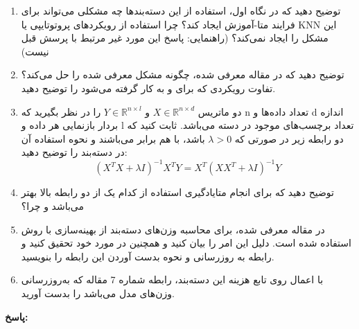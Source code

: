 \documentclass{article}
\begin{document}
\begin{enumerate}
	\item
	توضیح دهید که در نگاه اول، استفاده از این دسته‌بندها چه مشکلی می‌تواند برای فرایند متا-آموزش ایجاد کند؟ چرا استفاده از رویکردهای پروتوتایپی یا KNN این مشکل را ایجاد نمی‌کند؟ (راهنمایی: پاسخ این مورد غیر مرتبط با پرسش قبل نیست)

	\item
	توضیح دهید که در مقاله معرفی شده، چگونه مشکل معرفی شده را حل می‌کند؟ تفاوت رویکردی که برای
	  و 
	  به کار گرفته می‌شود را توضیح دهید.
	
	\item
	دو ماتریس
	$X \in {\mathbb{R}^{n \times d}}$
	و
	$Y \in {\mathbb{R}^{n \times l}}$
	را در نظر بگیرید که n تعداد داده‌ها و d اندازه بردار باز‌نمایی هر داده و l تعداد برچسب‌های موجود در دسته می‌باشد. ثابت کنید که دو رابطه زیر در صورتی که
	$\lambda  > 0$
	باشد، با هم برابر می‌باشند و نحوه استفاده آن در دسته‌بند 
	 را توضیح دهید:
	$$
	{\left( {{X^T}X + \lambda I} \right)^{ - 1}}{X^T}Y = {X^T}{\left( {X{X^T} + \lambda I} \right)^{ - 1}}Y
	$$
	
	\item
	توضیح دهید که برای انجام متایادگیری استفاده از کدام یک از دو رابطه بالا بهتر می‌باشد و چرا؟
	
	\item
	در مقاله معرفی شده، برای محاسبه وزن‌های دسته‌بند
	از بهینه‌سازی با روش 
استفاده شده است. دلیل این امر را بیان کنید و همچنین در مورد خود
	تحقیق کنید و رابطه به روزرسانی و نحوه بدست آوردن این رابطه را بنویسید.
	
	\item
	با اعمال
	روی تابع هزینه این دسته‌بند، رابطه شماره 7 مقاله که به‌روزرسانی وزن‌های مدل می‌باشد را بدست آورید.


\end{enumerate}


\textbf{پاسخ:}
\end{document}
